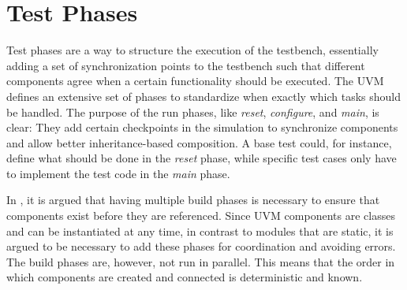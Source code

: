 \section{Test Phases} %

Test phases are a way to structure the execution of the testbench, essentially adding a set of synchronization points
to the testbench such that different components agree when a certain functionality should be executed. The UVM
defines an extensive set of phases to standardize when exactly which tasks should be handled. The purpose of the run
phases, like \textit{reset}, \textit{configure}, and \textit{main}, is clear: They add certain checkpoints in the
simulation to synchronize components and allow better inheritance-based composition. A base test could, for instance,
define what should be done in the \textit{reset} phase, while specific test cases only have to implement the test
code in the \textit{main} phase.

In \cite{uvm_phases}, it is argued that having multiple build phases is necessary to ensure that components exist
before they are referenced. Since UVM components are classes and can be instantiated at any time, in contrast to
modules that are static, it is argued to be necessary to add these phases for coordination and avoiding errors. The build phases are, however, not run in parallel. This means that the order in which components are created and connected is deterministic and known.

